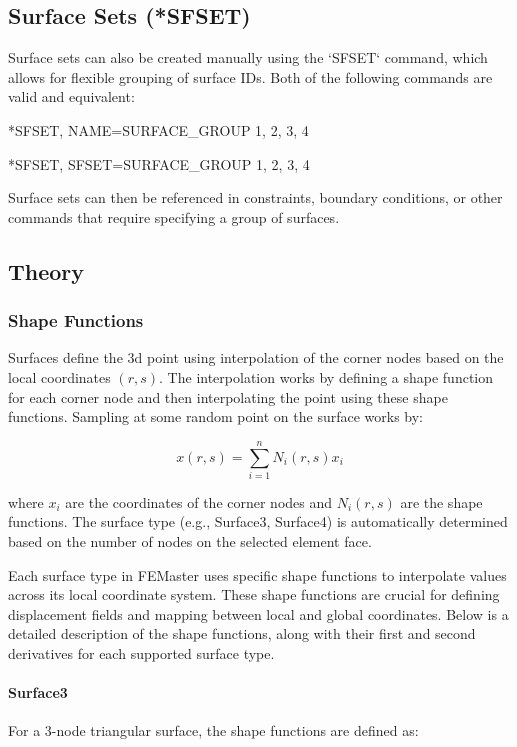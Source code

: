 \subsection{Surface Sets (*SFSET)}

Surface sets can also be created manually using the `SFSET` command, which allows for flexible grouping of surface IDs.
Both of the following commands are valid and equivalent:

\begin{codeBlock}
*SFSET, NAME=SURFACE_GROUP
1, 2, 3, 4
\end{codeBlock}

\begin{codeBlock}
*SFSET, SFSET=SURFACE_GROUP
1, 2, 3, 4
\end{codeBlock}

Surface sets can then be referenced in constraints, boundary conditions, or other commands that require specifying a group of surfaces.

\subsection{Theory}

\subsubsection{Shape Functions}

Surfaces define the 3d point using interpolation of the corner nodes based on the local coordinates $(r, s)$.
The interpolation works by defining a shape function for each corner node and then interpolating the point using these shape functions.
Sampling at some random point on the surface works by:

\[
x(r, s) = \sum_{i=1}^{n} N_i(r, s) x_i
\]

where $x_i$ are the coordinates of the corner nodes and $N_i(r, s)$ are the shape functions.
The surface type (e.g., Surface3, Surface4) is automatically determined based on the number of nodes on the selected element face.

Each surface type in FEMaster uses specific shape functions to interpolate values across its local coordinate system.
These shape functions are crucial for defining displacement fields and mapping between local and global coordinates.
Below is a detailed description of the shape functions, along with their first and second derivatives for each supported surface type.

\paragraph{Surface3}
For a 3-node triangular surface, the shape functions are defined as:

